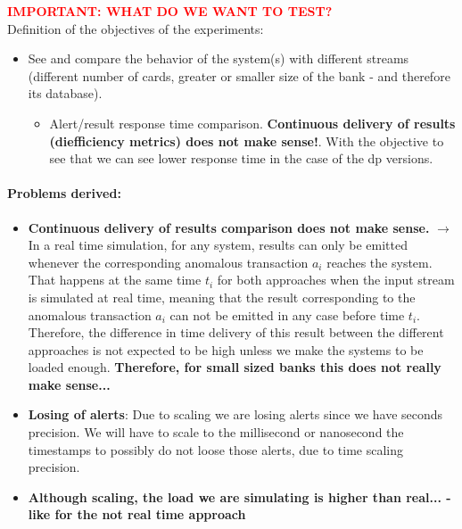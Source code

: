 \begin{tcolorbox}[colframe=red!75]
\textcolor{red}{\textbf{IMPORTANT: WHAT DO WE WANT TO TEST?\\}}
Definition of the objectives of the experiments:
\begin{itemize}
    \item See and compare the behavior of the system(s) with different streams (different number of cards, greater or smaller size of the bank - and therefore its database). \\
    \begin{itemize}
        \item Alert/result response time comparison. \textbf{Continuous delivery of results (diefficiency metrics) does not make sense!}. With the objective to see that we can see lower response time in the case of the dp versions.
    \end{itemize}
\end{itemize}
\end{tcolorbox}

\paragraph{Problems derived:\\}
\begin{itemize}
    \item \textbf{Continuous delivery of results comparison does not make sense.} $\rightarrow$ In a real time simulation, for any system, results can only be emitted whenever the corresponding anomalous transaction $a_i$ reaches the system. That happens at the same time $t_i$ for both approaches when the input stream is simulated at real time, meaning that the result corresponding to the anomalous transaction $a_i$ can not be emitted in any case before time $t_i$. Therefore, the difference in time delivery of this result between the different approaches is not expected to be high unless we make the systems to be loaded enough. \textbf{Therefore, for small sized banks this does not really make sense...}
    \item \textbf{Losing of alerts}: Due to scaling we are losing alerts since we have seconds precision. We will have to scale to the millisecond or nanosecond the timestamps to possibly do not loose those alerts, due to time scaling precision.
    \item \textbf{Although scaling, the load we are simulating is higher than real... - like for the not real time approach}
\end{itemize}

